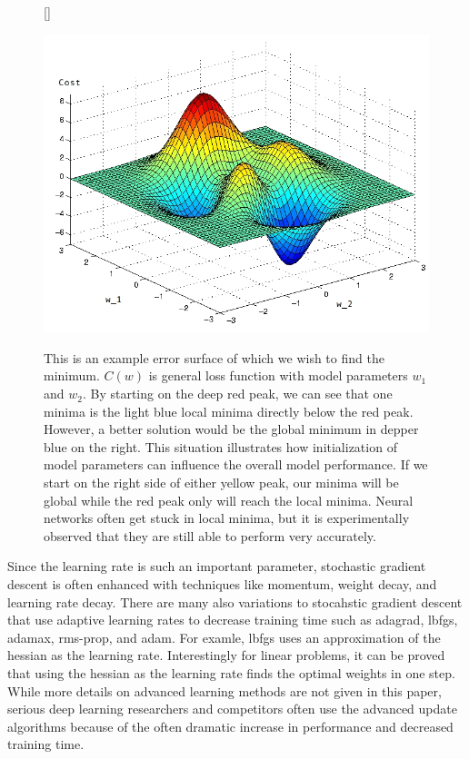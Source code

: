\message{ !name(main.tex)}\documentclass[11pt]{article}
\begin{document}
\begin{figure}[H]
  [\FBwidth]
  {\caption{This is an example error surface of which we wish to find the minimum. $C(w)$ is general loss function with model parameters $w_{1}$ and $w_{2}$. By starting on the deep red peak, we can see that one minima is the light blue local minima directly below the red peak. However, a better solution would be the global minimum in depper blue on the right. This situation illustrates how initialization of model parameters can influence the overall model performance. If we start on the right side of either yellow peak, our minima will be global while the red peak only will reach the local minima. Neural networks often get stuck in local minima, but it is experimentally observed that they are still able to perform very accurately.
}\label{fig:error_plot}}{\includegraphics[width=0.9\linewidth]{error_plot}}
\end{figure}

Since the learning rate is such an important parameter, stochastic gradient descent is often enhanced with techniques like momentum, weight decay, and learning rate decay. There are many also variations to stocahstic gradient descent that use adaptive learning rates to decrease training time such as adagrad, lbfgs, adamax, rms-prop, and adam. For examle, lbfgs uses an approximation of the hessian as the learning rate. Interestingly for linear problems, it can be proved that using the hessian as the learning rate finds the optimal weights in one step. While more details on advanced learning methods are not given in this paper, serious deep learning researchers and competitors often use the advanced update algorithms because of the often dramatic increase in performance and decreased training time.
\end{document}
